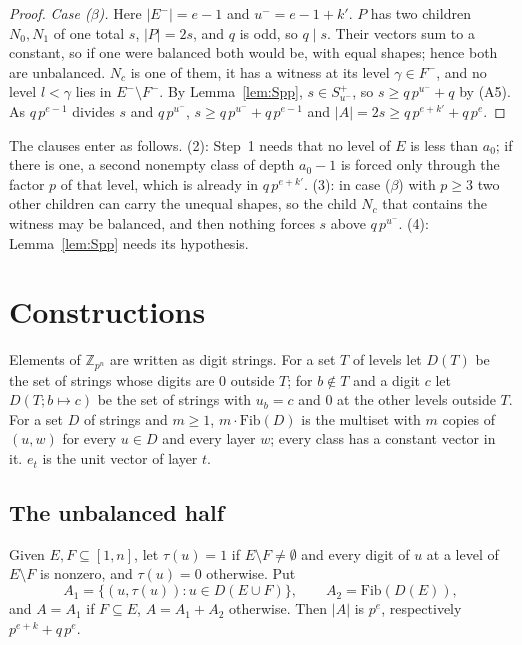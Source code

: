 \documentclass[11pt,a4paper]{amsart}
\theoremstyle{definition}
\theoremstyle{remark}
\newcommand{\Z}{\mathbb{Z}}
\newcommand{\Sp}{S^{+}}
\begin{document}
\begin{proof}
\emph{Case ($\beta$).} Here $|E^-|=e-1$ and $u^-=e-1+k'$. $P$ has two children $N_0,N_1$ of one total $s$,
$|P|=2s$, and $q$ is odd, so $q\mid s$. Their vectors sum to a constant, so if one were balanced both would
be, with equal shapes; hence both are unbalanced. $N_c$ is one of them, it has a witness at its level
$\gamma\in F^-$, and no level $l<\gamma$ lies in $E^-\setminus F^-$. By Lemma~\ref{lem:Spp}, $s\in\Sp_{u^-}$, so
$s\ge q\,p^{u^-}+q$ by (A5). As $q\,p^{e-1}$ divides $s$ and $q\,p^{u^-}$,
$s\ge q\,p^{u^-}+q\,p^{e-1}$ and $|A|=2s\ge q\,p^{e+k'}+q\,p^e$.
\end{proof}

The clauses enter as follows. (2): Step~1 needs that no level of $E$ is less than $a_0$; if there is one, a second nonempty class of
depth $a_0-1$ is forced only through the factor $p$ of that level, which is already in $q\,p^{e+k'}$.
(3): in case ($\beta$) with $p\ge3$ two other children can carry the unequal shapes, so the child $N_c$
that contains the witness may be balanced, and then nothing forces $s$ above $q\,p^{u^-}$. (4):
Lemma~\ref{lem:Spp} needs its hypothesis.

\section{Constructions}\label{sec:constructions}

Elements of $\Z_{p^n}$ are written as digit strings. For a set $T$ of levels let $D(T)$ be the set of
strings whose digits are $0$ outside $T$; for $b\notin T$ and a digit $c$ let $D(T;b\mapsto c)$ be the set of
strings with $u_b=c$ and $0$ at the other levels outside $T$. For a set $D$ of strings and $m\ge1$,
$m\cdot\mathrm{Fib}(D)$ is the multiset with $m$ copies of $(u,w)$ for every $u\in D$ and every layer $w$;
every class has a constant vector in it. $e_t$ is the unit vector of layer $t$.

\subsection{The unbalanced half} Given $E,F\subseteq[1,n]$, let $\tau(u)=1$ if $E\setminus F\ne\emptyset$
and every digit of $u$ at a level of $E\setminus F$ is nonzero, and $\tau(u)=0$ otherwise. Put
\[ A_1=\{(u,\tau(u)):u\in D(E\cup F)\},\qquad A_2=\mathrm{Fib}(D(E)), \]
and $A=A_1$ if $F\subseteq E$, $A=A_1+A_2$ otherwise. Then $|A|$ is $p^{e}$, respectively $p^{e+k}+q\,p^{e}$.
\end{document}
